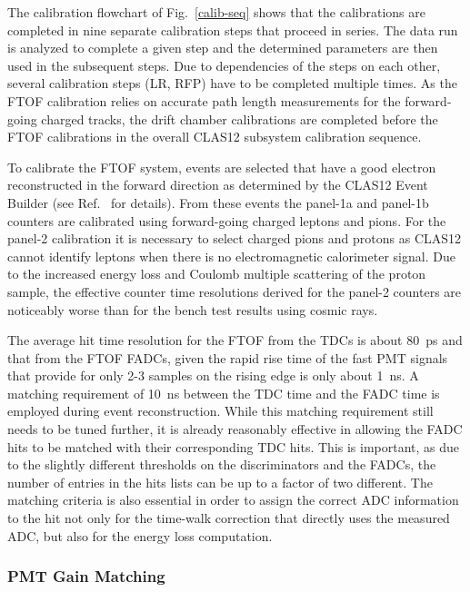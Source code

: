 \documentclass[final,3p,twocolumn]{elsarticle}
\begin{document}
The calibration flowchart of Fig.~\ref{calib-seq} shows that the calibrations are completed in nine separate
calibration steps that proceed in series. The data run is analyzed to complete a given step and the determined
parameters are then used in the subsequent steps. Due to dependencies of the steps on each other, several
calibration steps (LR, RFP) have to be completed multiple times. As the FTOF calibration relies on accurate
path length measurements for the forward-going charged tracks, the drift chamber calibrations are completed
before the FTOF calibrations in the overall CLAS12 subsystem calibration sequence.

To calibrate the FTOF system, events are selected that have a good electron reconstructed in the forward
direction as determined by the CLAS12 Event Builder (see Ref.~\cite{daq-nim} for details). From these events
the panel-1a and panel-1b counters are calibrated using forward-going charged leptons and pions. For the panel-2
calibration it is necessary to select charged pions and protons as CLAS12 cannot identify leptons when there is no
electromagnetic calorimeter signal. Due to the increased energy loss and Coulomb multiple scattering of the proton
sample, the effective counter time resolutions derived for the panel-2 counters are noticeably worse than for the
bench test results using cosmic rays.

The average hit time resolution for the FTOF from the TDCs is about 80~ps and that from the FTOF
FADCs, given the rapid rise time of the fast PMT signals that provide for only 2-3 samples on the rising
edge is only about 1~ns. A matching requirement of 10~ns between the TDC time and the FADC time is
employed during event reconstruction. While this matching requirement still needs to be tuned further,
it is already reasonably effective in allowing the FADC hits to be matched with their corresponding TDC
hits. This is important, as due to the slightly different thresholds on the discriminators and the FADCs, the
number of entries in the hits lists can be up to a factor of two different. The matching criteria is also
essential in order to assign the correct ADC information to the hit not only for the time-walk correction
that directly uses the measured ADC, but also for the energy loss computation.

\subsubsection{PMT Gain Matching}
\label{gain-matching}
\end{document}
